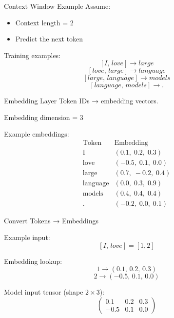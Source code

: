 \documentclass{beamer}
\begin{document}
\begin{frame}{Context Window Example}
Assume:
\begin{itemize}
    \item Context length = 2
    \item Predict the next token
\end{itemize}

Training examples:
\[
[I,\, love] \rightarrow large
\]
\[
[love,\, large] \rightarrow language
\]
\[
[large,\, language] \rightarrow models
\]
\[
[language,\, models] \rightarrow .
\]
\end{frame}

\begin{frame}{Embedding Layer}
Token IDs → embedding vectors.

Embedding dimension = 3

Example embeddings:
\[
\begin{array}{c|c}
\text{Token} & \text{Embedding} \\
\hline
\text{I} & (0.1,\;0.2,\;0.3) \\
\text{love} & (-0.5,\;0.1,\;0.0) \\
\text{large} & (0.7,\;-0.2,\;0.4) \\
\text{language} & (0.0,\;0.3,\;0.9) \\
\text{models} & (0.4,\;0.4,\;0.4) \\
\text{.} & (-0.2,\;0.0,\;0.1)
\end{array}
\]
\end{frame}

\begin{frame}{Convert Tokens → Embeddings}

Example input:
\[
[I,\, love] = [1,2]
\]

Embedding lookup:
\[
1 \rightarrow (0.1,\, 0.2,\, 0.3)
\]
\[
2 \rightarrow (-0.5,\, 0.1,\, 0.0)
\]

Model input tensor (shape $2 \times 3$):
\[
\begin{pmatrix}
0.1 & 0.2 & 0.3 \\
-0.5 & 0.1 & 0.0
\end{pmatrix}
\]
\end{frame}
\end{document}
